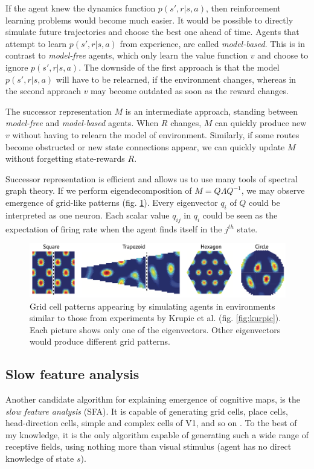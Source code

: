 \documentclass[oneside,english,logo]{amuthesis}
\begin{document}
If the agent knew the dynamics function $p(s',r|s,a)$, then reinforcement learning problems would become much easier. It would be possible to directly simulate future trajectories and choose the best one ahead of time. Agents that attempt to learn $p(s',r|s,a)$ from experience, are called \textit{model-based}. This is in contrast to \textit{model-free} agents, which only learn the value function $v$ and choose to ignore $p(s',r|s,a)$. The downside of the first approach is that the model $p(s',r|s,a)$  will have to be relearned, if the environment changes, whereas in the second approach $v$ may become outdated as soon as the reward changes. 

The successor representation $M$ is an intermediate approach, standing between \textit{model-free} and \textit{model-based} agents. When $R$ changes, $M$ can quickly produce new $v$ without having to relearn the model of environment. Similarly, if some routes become obstructed or new state connections appear, we can quickly update $M$ without forgetting state-rewards $R$. 

Successor representation is efficient and allows us to use many tools of spectral graph theory. If we perform eigendecomposition of $M=Q\Lambda Q^{-1}$, we may observe emergence of grid-like patterns (fig. \ref{fig:successor_repr_sim}). Every eigenvector $q_i$ of $Q$ could be interpreted as one neuron. Each scalar value $q_{ij}$ in $q_i$ could be seen as the expectation of firing rate when the agent finds itself in the $j^{th}$ state. 
\begin{figure}[!htbp]
	\centering
	\includegraphics[width=12cm]{successor_repr_sim}
	\caption{Grid cell patterns appearing by simulating agents in environments similar to those from experiments by Krupic et al. (fig. \ref{fig:kurpic}). Each picture shows only one of the eigenvectors. Other eigenvectors would produce different grid patterns.}
	\label{fig:successor_repr_sim}
\end{figure}

\subsection{Slow feature analysis}

Another candidate algorithm for explaining emergence of cognitive maps, is the \textit{slow feature analysis} \cite{slow_feature_analysis} (SFA). It is capable of generating grid cells, place cells, head-direction cells, simple and complex cells of V1, and so on \cite{slowness_sparseness}. To the best of my knowledge, it is the only algorithm capable of generating such a wide range of receptive fields, using nothing more than visual stimulus (agent has no direct knowledge of state $s$). 
\end{document}
